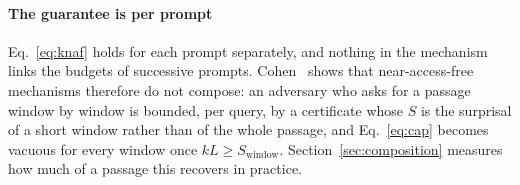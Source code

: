 \paragraph{The guarantee is per prompt}
Eq.~\eqref{eq:knaf} holds for each prompt separately, and nothing in the mechanism links the budgets of successive prompts. Cohen~\cite{cohen2025blameless} shows that near-access-free mechanisms therefore do not compose: an adversary who asks for a passage window by window is bounded, per query, by a certificate whose $S$ is the surprisal of a short window rather than of the whole passage, and Eq.~\eqref{eq:cap} becomes vacuous for every window once $k L \ge S_{\mathrm{window}}$. Section~\ref{sec:composition} measures how much of a passage this recovers in practice.
